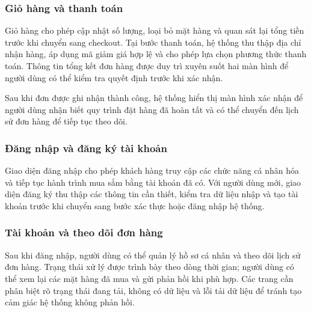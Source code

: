 \subsubsection{Giỏ hàng và thanh toán}

Giỏ hàng cho phép cập nhật số lượng, loại bỏ mặt hàng và quan sát lại tổng tiền trước khi chuyển sang
checkout. Tại bước thanh toán, hệ thống thu thập địa chỉ nhận hàng, áp dụng mã giảm giá hợp lệ và cho
phép lựa chọn phương thức thanh toán. Thông tin tổng kết đơn hàng được duy trì xuyên suốt hai màn
hình để người dùng có thể kiểm tra quyết định trước khi xác nhận.



Sau khi đơn được ghi nhận thành công, hệ thống hiển thị màn hình xác nhận để người dùng nhận biết
quy trình đặt hàng đã hoàn tất và có thể chuyển đến lịch sử đơn hàng để tiếp tục theo dõi.


\subsubsection{Đăng nhập và đăng ký tài khoản}

Giao diện đăng nhập cho phép khách hàng truy cập các chức năng cá nhân hóa và tiếp tục hành trình
mua sắm bằng tài khoản đã có. Với người dùng mới, giao diện đăng ký thu thập các thông tin cần thiết,
kiểm tra dữ liệu nhập và tạo tài khoản trước khi chuyển sang bước xác thực hoặc đăng nhập hệ thống.



\subsubsection{Tài khoản và theo dõi đơn hàng}

Sau khi đăng nhập, người dùng có thể quản lý hồ sơ cá nhân và theo dõi lịch sử đơn hàng. Trạng thái
xử lý được trình bày theo dòng thời gian; người dùng có thể xem lại các mặt hàng đã mua và gửi phản
hồi khi phù hợp. Các trang cần phân biệt rõ trạng thái đang tải, không có dữ liệu và lỗi tải dữ liệu
để tránh tạo cảm giác hệ thống không phản hồi.


